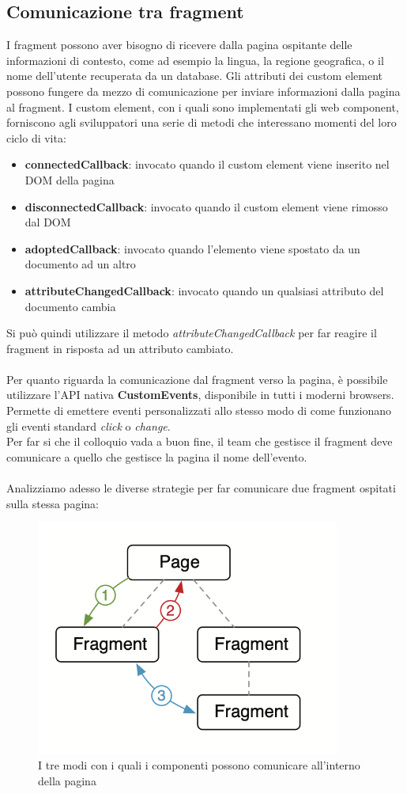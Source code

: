 \subsection{Comunicazione tra fragment}
I fragment possono aver bisogno di ricevere dalla pagina 
ospitante delle informazioni di contesto, come ad esempio la lingua, 
la regione geografica, o il nome dell'utente recuperata da un database.
Gli attributi dei custom element possono fungere da mezzo di comunicazione per inviare
informazioni dalla pagina al fragment.
I custom element, con i quali sono implementati gli web component, forniscono agli sviluppatori 
una serie di metodi che interessano momenti del loro ciclo di vita:
\begin{itemize}
    \item \textbf{connectedCallback}: invocato quando il custom element viene inserito nel DOM della pagina 
    \item \textbf{disconnectedCallback}: invocato quando il custom element viene rimosso dal DOM
    \item \textbf{adoptedCallback}: invocato quando l'elemento viene spostato da un documento ad un altro
    \item \textbf{attributeChangedCallback}: invocato quando un qualsiasi attributo del documento cambia
\end{itemize}
Si può quindi utilizzare il metodo \emph{attributeChangedCallback} per far reagire il fragment in risposta ad un
attributo cambiato.
\\\\
Per quanto riguarda la comunicazione dal fragment verso la pagina, è possibile utilizzare 
l'API nativa \textbf{CustomEvents}, disponibile in tutti i moderni browsers.
Permette di emettere eventi personalizzati allo stesso modo di come funzionano gli eventi standard \emph{click} o \emph{change}.
\\
Per far si che il colloquio vada a buon fine, il team che gestisce il fragment deve comunicare a quello che gestisce la pagina
il nome dell'evento.
\\\\
Analizziamo adesso le diverse strategie per far comunicare due fragment ospitati sulla stessa pagina:

\begin{figure}[H]
    \centering
    \includegraphics[width=100mm]{img/comunicazione}
    \caption{I tre modi con i quali i componenti possono comunicare all'interno della pagina}
  \end{figure}

